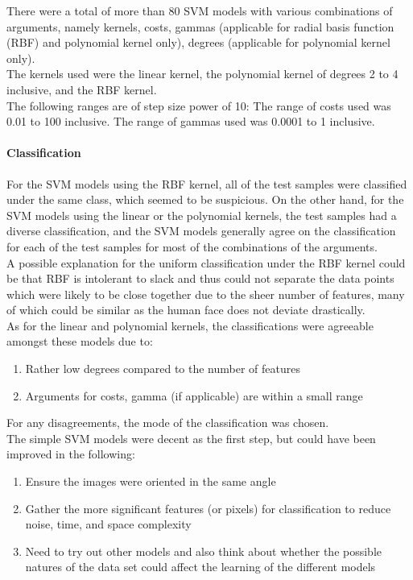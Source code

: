\documentclass{article}
\begin{document}
There were a total of more than 80 SVM models with various combinations of arguments, namely kernels, costs, gammas (applicable for radial basis function (RBF) and polynomial kernel only), degrees (applicable for polynomial kernel only). \\

The kernels used were the linear kernel, the polynomial kernel of degrees 2 to 4 inclusive, and the RBF kernel. \\

The following ranges are of step size power of 10: The range of costs used was 0.01 to 100 inclusive. The range of gammas used was 0.0001 to 1 inclusive.

\paragraph{Classification} For the SVM models using the RBF kernel, all of the test samples were classified under the same class, which seemed to be suspicious. On the other hand, for the SVM models using the linear or the polynomial kernels, the test samples had a diverse classification, and the SVM models generally agree on the classification for each of the test samples for most of the combinations of the arguments. \\

A possible explanation for the uniform classification under the RBF kernel could be that RBF is intolerant to slack \cite{bib-01} and thus could not separate the data points which were likely to be close together due to the sheer number of features, many of which could be similar as the human face does not deviate drastically. \\

As for the linear and polynomial kernels, the classifications were agreeable amongst these models due to:
\begin{enumerate}
	\item Rather low degrees compared to the number of features
	\item Arguments for costs, gamma (if applicable) are within a small range
\end{enumerate}

For any disagreements, the mode of the classification was chosen. \\

The simple SVM models were decent as the first step, but could have been improved in the following:
\begin{enumerate}
	\item Ensure the images were oriented in the same angle
	\item Gather the more significant features (or pixels) for classification to reduce noise, time, and space complexity
	\item Need to try out other models and also think about whether the possible natures of the data set could affect the learning of the different models
\end{enumerate}
\end{document}
